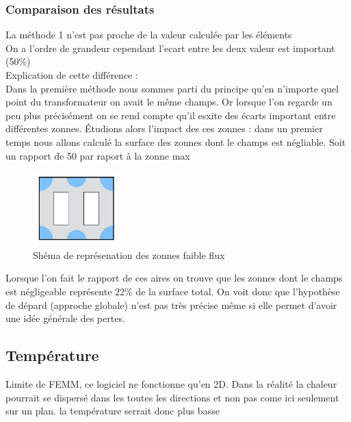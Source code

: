 

\newpage
\subsubsection{Comparaison des résultats}
La méthode 1 n'est pas proche de la valeur calculée par les éléments\\
On a l'ordre de grandeur cependant l'ecart entre les deux valeur est important (50\%)\\

Explication de cette différence : \\
Dans la première méthode nous sommes parti du principe qu'en n'importe quel point du transformateur on avait le même champs. Or lorsque l'on regarde un peu plus précisément on se rend compte qu'il esxite des écarts important entre différentes zonnes.
Étudions alors l'impact des ces zonnes : dans un premier temps nous allons calculé la surface des zonnes dont le champs est négliable. Soit un rapport de 50 par raport à la zonne max

\begin{figure}
	\begin{center}
	\includegraphics[width=0.3\textwidth]{images/TP3_zones_mortes}
	\caption{Shéma de représenation des zonnes faible flux}\label{img:RepChamps}
	\end{center}
\end{figure}

Lorsque l'on fait le rapport de ces aires on trouve que les zonnes dont le champs est négligeable représente 22\% de la surface total. On voit donc que l'hypothèse de dépard (approche globale) n'est pas très précise même si elle permet d'avoir une idée générale des pertes.




\subsection{Température}


Limite de FEMM, ce logiciel ne fonctionne qu'en 2D. Dans la réalité la chaleur pourrait se dispersé dans les toutes les directions et non pas come ici seulement sur un plan. la température serrait donc plus basse 

